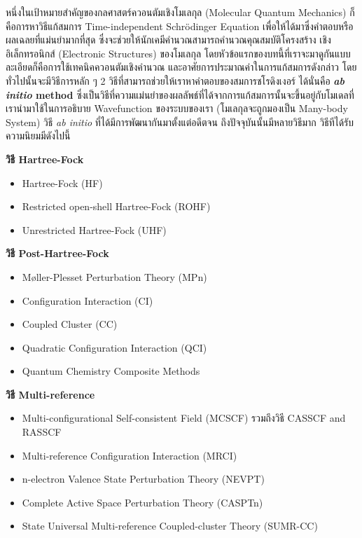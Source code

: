 หนึ่งในเป้าหมายสำคัญของกลศาสตร์ควอนตัมเชิงโมเลกุล (Molecular Quantum Mechanics) ก็คือการหาวิธีแก้สมการ Time-independent 
Schr\"{o}dinger Equation เพื่อให้ได้มาซึ่งคำตอบหรือผลเฉลยที่แม่นยำมากที่สุด ซึ่งจะช่วยให้นักเคมีคำนวณสามารถคำนวณคุณสมบัติโครงสร้าง%
เชิงอิเล็กทรอนิกส์ (Electronic Structures) ของโมเลกุล โดยหัวข้อแรกของบทนี้ที่เราจะมาดูกันแบบละเอียดก็คือการใช้เทคนิคควอนตัมเชิงคำนวณ%
และอาศัยการประมาณค่าในการแก้สมการดังกล่าว โดยทั่วไปนั้นจะมีวิธีการหลัก ๆ 2 วิธีที่สามารถช่วยให้เราหาคำตอบของสมการชโรดิงเงอร์ ได้นั่นคือ 
\textbf{\textit{ab initio} method} ซึ่งเป็นวิธีที่ความแม่นยำของผลลัพธ์ที่ได้จากการแก้สมการนั้นจะขึ้นอยู่กับโมเดลที่เรานำมาใช้ในการอธิบาย 
Wavefunction ของระบบของเรา (โมเลกุลจะถูกมองเป็น Many-body System) วิธี \textit{ab initio} ที่ได้มีการพัฒนากันมาตั้งแต่อดีตจน%
ถึงปัจจุบันนั้นมีหลายวิธีมาก\autocite{friesner2005} วิธีทีได้รับความนิยมมีดังไปนี้

\noindent \textbf{วิธี Hartree-Fock}
\begin{itemize}[topsep=0pt,noitemsep]
    \item Hartree-Fock (HF)
    \item Restricted open-shell Hartree-Fock (ROHF)
    \item Unrestricted Hartree-Fock (UHF)
\end{itemize}

\noindent \textbf{วิธี Post-Hartree-Fock}
\begin{itemize}[topsep=0pt,noitemsep]
    \item Møller-Plesset Perturbation Theory (MPn)
    \item Configuration Interaction (CI)
    \item Coupled Cluster (CC)
    \item Quadratic Configuration Interaction (QCI)
    \item Quantum Chemistry Composite Methods
\end{itemize}

\noindent \textbf{วิธี Multi-reference}
\begin{itemize}[topsep=0pt,noitemsep]
    \item Multi-configurational Self-consistent Field (MCSCF) รวมถึงวิธี CASSCF and RASSCF
    \item Multi-reference Configuration Interaction (MRCI)
    \item n-electron Valence State Perturbation Theory (NEVPT)
    \item Complete Active Space Perturbation Theory (CASPTn)
    \item State Universal Multi-reference Coupled-cluster Theory (SUMR-CC)
\end{itemize}

